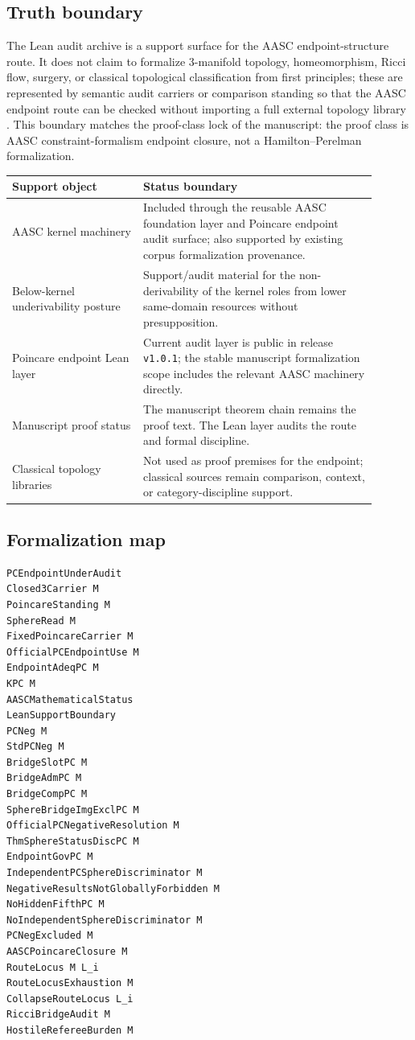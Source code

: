 \documentclass[11pt]{article}
\begin{document}
\subsection*{Truth boundary}
{}

The Lean audit archive is a support surface for the AASC endpoint-structure route. It does not claim to formalize 3-manifold topology, homeomorphism, Ricci flow, surgery, or classical topological classification from first principles; these are represented by semantic audit carriers or comparison standing so that the AASC endpoint route can be checked without importing a full external topology library \cite{PoincareLeanAuditGithub2026,PoincareLeanAuditRelease2026}. This boundary matches the proof-class lock of the manuscript: the proof class is AASC constraint-formalism endpoint closure, not a Hamilton--Perelman formalization.

\begin{longtable}{L{0.32\linewidth}L{0.58\linewidth}}
\toprule
\textbf{Support object} & \textbf{Status boundary}\\
\midrule
AASC kernel machinery & Included through the reusable AASC foundation layer and Poincare endpoint audit surface; also supported by existing corpus formalization provenance.\\
Below-kernel underivability posture & Support/audit material for the non-derivability of the kernel roles from lower same-domain resources without presupposition.\\
Poincare endpoint Lean layer & Current audit layer is public in release \texttt{v1.0.1}; the stable manuscript formalization scope includes the relevant AASC machinery directly.\\
Manuscript proof status & The manuscript theorem chain remains the proof text. The Lean layer audits the route and formal discipline.\\
Classical topology libraries & Not used as proof premises for the endpoint; classical sources remain comparison, context, or category-discipline support.\\
\bottomrule
\end{longtable}

\subsection*{Formalization map}
{}
\begin{verbatim}
PCEndpointUnderAudit
Closed3Carrier M
PoincareStanding M
SphereRead M
FixedPoincareCarrier M
OfficialPCEndpointUse M
EndpointAdeqPC M
KPC M
AASCMathematicalStatus
LeanSupportBoundary
PCNeg M
StdPCNeg M
BridgeSlotPC M
BridgeAdmPC M
BridgeCompPC M
SphereBridgeImgExclPC M
OfficialPCNegativeResolution M
ThmSphereStatusDiscPC M
EndpointGovPC M
IndependentPCSphereDiscriminator M
NegativeResultsNotGloballyForbidden M
NoHiddenFifthPC M
NoIndependentSphereDiscriminator M
PCNegExcluded M
AASCPoincareClosure M
RouteLocus M L_i
RouteLocusExhaustion M
CollapseRouteLocus L_i
RicciBridgeAudit M
HostileRefereeBurden M
\end{verbatim}
\end{document}
